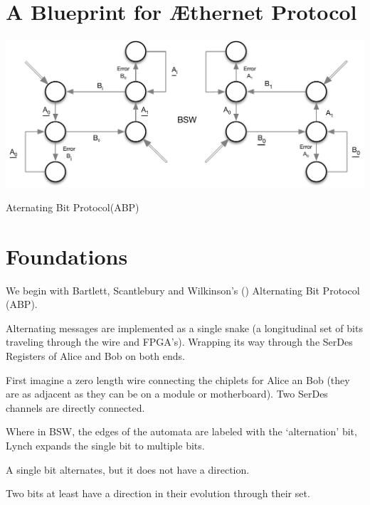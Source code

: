 \section{A Blueprint for Æthernet Protocol} 
\begin{marginfigure}
  \includegraphics[width=1.2\linewidth]{../Figures/BSW.pdf}
  \caption{Aternating Bit Protocol(ABP)}
\end{marginfigure}

\section{Foundations}

We begin with Bartlett, Scantlebury and Wilkinson's  (\cite{BSW})  Alternating Bit Protocol (ABP).

Alternating messages are implemented as a single snake (a longitudinal set of bits traveling through the wire and FPGA's). Wrapping its way through the SerDes Registers of Alice and Bob on both ends.

First imagine a zero length wire connecting the chiplets for Alice an Bob (they are as adjacent as they can be on a module or motherboard). Two SerDes channels are directly connected. 

Where in BSW, the edges of the automata are labeled with the `alternation' bit, Lynch expands the single bit to multiple bits.

A single bit alternates, but it does not have a direction.

\begin{highlightbox}
Two bits at least have a direction in their evolution through their set.
\end{highlightbox}

